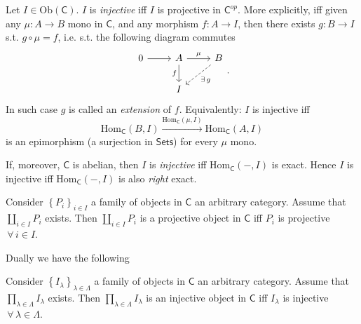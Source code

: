 \begin{defn}
	Let $I \in \mathrm{Ob} \left(\mathsf{C}\right)$.
	$I$ is {\em injective} iff $I$ is projective in $\mathsf{C}^{op}$.
	More explicitly, iff given any $\mu\colon A \to B$ mono in $\mathsf{C}$,
	and any morphism $f\colon A \to I$, then there exists $g\colon B \to I$ s.t. $g \circ \mu = f$,
	i.e. s.t. the following diagram commutes
	\begin{equation}
	\begin{tikzcd}
		0 \arrow[r, "", rightarrow]  &
		A \arrow[r, "\mu", rightarrow] \arrow[d, "f"', rightarrow] &
		B \arrow[dl, "\exists\, g", dashrightarrow] \\
		& I &
	\end{tikzcd}
	.\end{equation} 
	In such case $g$ is called an {\em extension} of $f$.\newline
	Equivalently:
	$I$ is injective iff
	\begin{equation}
	\mathrm{Hom}_{\mathsf{C}} \left( B, I \right) \xrightarrow{\mathrm{Hom}_{\mathsf{C}} \left( \mu, I \right)} 
	\mathrm{Hom}_{\mathsf{C}} \left( A, I \right)
	\end{equation} 
	is an epimorphism (a surjection in $\mathsf{Sets}$) for every $\mu$ mono.
\end{defn}

\begin{rem}
	If, moreover, $\mathsf{C}$ is abelian, then
	$I$ is {\em injective} iff $\mathrm{Hom}_{\mathsf{C}} \left( -, I \right)$ is exact.
	Hence $I$ is injective iff $\mathrm{Hom}_{\mathsf{C}} \left( -, I\right)$ is also {\em right} exact.
\end{rem}

\begin{prop}
	Consider $\left\{ P_i \right\}_{i \in I}$ a family of objects in $\mathsf{C}$ an arbitrary category.
	Assume that $\coprod_{i \in I} P_i$ exists.
	Then $\coprod_{i \in I} P_i$ is a projective object in $\mathsf{C}$ 
	iff $P_i$ is projective $\,\forall\, i \in I$.
\end{prop} 

Dually we have the following

\begin{prop}
	Consider $\left\{ I_\lambda \right\}_{\lambda \in \Lambda}$ a family of objects in $\mathsf{C}$ an arbitrary category.
	Assume that $\prod_{\lambda \in \Lambda} I_\lambda$ exists.
	Then $\prod_{\lambda \in \Lambda} I_\lambda$ is an injective object in $\mathsf{C}$ 
	iff $I_\lambda$ is injective $\,\forall\, \lambda \in \Lambda$.
\end{prop} 

